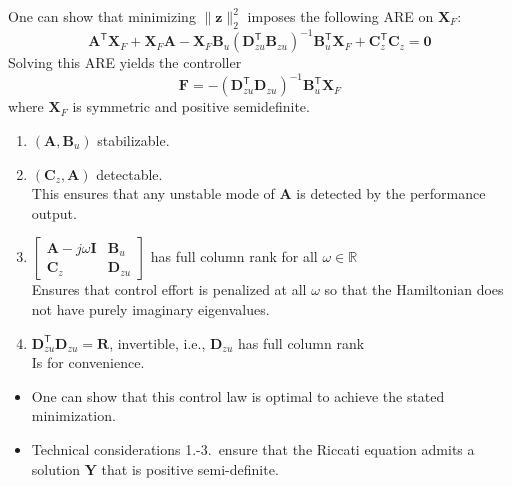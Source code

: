 \newpar{}

One can show that minimizing $\|\mathbf{z}\|_2^2$ imposes the following ARE on $\mathbf{X}_F$:
\begin{equation*}
    \mathbf{A}^{\mathsf{T}}\mathbf{X}_F + \mathbf{X}_F \mathbf{A} - \mathbf{X}_F \mathbf{B}_u{\left(\mathbf{D}_{zu}^{\mathsf{T}}\mathbf{B}_{zu}\right)}^{-1} \mathbf{B}_u^{\mathsf{T}} \mathbf{X}_F + \mathbf{C}_z^{\mathsf{T}}\mathbf{C}_z = \mathbf{0}
\end{equation*}
Solving this ARE yields the controller
\begin{equation*}
    \mathbf{F} = -{\left(\mathbf{D}_{zu}^{\mathsf{T}}\mathbf{D}_{zu}\right)}^{-1} \mathbf{B}_u^{\mathsf{T}}\mathbf{X}_F
\end{equation*}
where $\mathbf{X}_F$ is symmetric and positive semidefinite.

\newpar{}

\begin{enumerate}
    \item $(\mathbf{A},\mathbf{B}_u)$ stabilizable.
    \item $(\mathbf{C}_z,\mathbf{A})$ detectable.\\
          This ensures that any unstable mode of $\mathbf{A}$ is detected by the performance output.
    \item $\begin{bmatrix} \mathbf{A}- j\omega \mathbf{I}& \mathbf{B}_u\\ \mathbf{C}_z& \mathbf{D}_{zu}\end{bmatrix}$ has full column rank for all $\omega\in\mathbb{R}$\\
          Ensures that control effort is penalized at all $\omega$ so that the Hamiltonian does not have purely imaginary eigenvalues.
    \item $\mathbf{D}_{zu}^{\mathsf{T}}\mathbf{D}_{zu}=\mathbf{R}$, invertible, i.e., $\mathbf{D}_{zu}$ has full column rank\\
          Is for convenience.
\end{enumerate}

\newpar{}

\begin{itemize}
    \item One can show that this control law is optimal to achieve the stated minimization.
    \item Technical considerations 1.-3.\ ensure that the Riccati equation admits a solution $\mathbf{Y}$ that is positive semi-definite.
\end{itemize}


